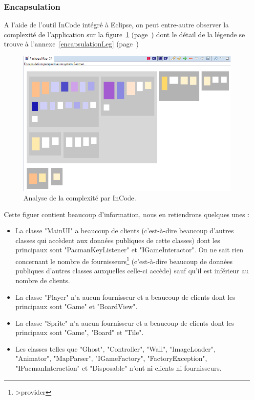 \documentclass[12pt,a4paper,final]{article}
\newcommand{\annexe}[1]{annexe~\ref{#1} (page~\pageref{#1})}
\newcommand{\labelfigure}[1]{figure~\ref{#1} (page~\pageref{#1})}
\begin{document}
\subsubsection{Encapsulation}
A l'aide de l'outil InCode intégré à Eclipse, on peut entre-autre observer la complexité de l'application sur la \labelfigure{encapsulation} dont le détail de la légende se trouve à l'\annexe{encapsulationLeg}
\begin{figure}[!h]
	\centering
	\includegraphics[width=\textwidth]{InCodeEncapsulation.png}
	\caption{\label{encapsulation}Analyse de la complexité par InCode.}
\end{figure}
Cette figuer contient beaucoup d'information, nous en retiendrons quelques unes : 
\begin{itemize}
\item La classe "MainUI" a beaucoup de clients (c'est-à-dire beaucoup d'autres classes qui accèdent aux données publiques de cette classes) dont les principaux sont "PacmanKeyListener" et "IGameInteractor". On ne sait rien concernant le nombre de fournisseurs\footnote{>provider} (c'est-à-dire beaucoup de données publiques d'autres classes auxquelles celle-ci accède) sauf qu'il est inférieur au nombre de clients.
\item La classe "Player" n'a aucun fournisseur et a beaucoup de clients dont les principaux sont "Game" et "BoardView".
\item La classe "Sprite" n'a aucun fournisseur et a beaucoup de clients dont les principaux sont "Game", "Board" et "Tile".
\item Les classes telles que "Ghost", "Controller", "Wall", "ImageLoader", "Animator", "MapParser", "IGameFactory", "FactoryException", "IPacmanInteraction" et "Disposable" n'ont ni clients ni fournisseurs.
\end{itemize}
\end{document}
